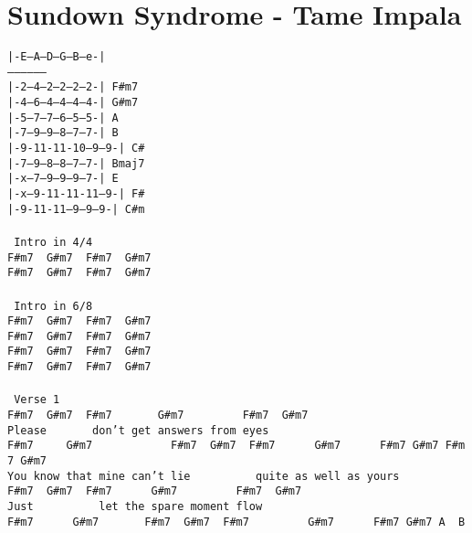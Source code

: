 \newpage
\section{Sundown Syndrome - Tame Impala}
\label{Sundown Syndrome - Tame Impala}
\texttt{|-E--A--D--G--B--e-|\\
------------------\\
|-2--4--2--2--2--2-|\ F\#m7\\
|-4--6--4--4--4--4-|\ G\#m7\\
|-5--7--7--6--5--5-|\ A\\
|-7--9--9--8--7--7-|\ B\\
|-9-11-11-10--9--9-|\ C\#\\
|-7--9--8--8--7--7-|\ Bmaj7\\
|-x--7--9--9--9--7-|\ E\\
|-x--9-11-11-11--9-|\ F\#\\
|-9-11-11--9--9--9-|\ C\#m\\
\\
\lbrack\ Intro\ in\ 4/4\rbrack\\
F\#m7\ \ G\#m7\ \ F\#m7\ \ G\#m7\\
F\#m7\ \ G\#m7\ \ F\#m7\ \ G\#m7\\
\\
\lbrack\ Intro\ in\ 6/8\rbrack\\
F\#m7\ \ G\#m7\ \ F\#m7\ \ G\#m7\\
F\#m7\ \ G\#m7\ \ F\#m7\ \ G\#m7\\
F\#m7\ \ G\#m7\ \ F\#m7\ \ G\#m7\\
F\#m7\ \ G\#m7\ \ F\#m7\ \ G\#m7\\
\\
\lbrack\ Verse\ 1\rbrack\\
F\#m7\ \ G\#m7\ \ F\#m7\ \ \ \ \ \ \ G\#m7\ \ \ \ \ \ \ \ \ F\#m7\ \ G\#m7\\
Please\ \ \ \ \ \ \ don't\ get\ answers\ from\ eyes\\
F\#m7\ \ \ \ \ G\#m7\ \ \ \ \ \ \ \ \ \ \ \ F\#m7\ \ G\#m7\ \ F\#m7\ \ \ \ \ \ G\#m7\ \ \ \ \ \ F\#m7\ G\#m7\ F\#m7\ G\#m7\\
You\ know\ that\ mine\ can't\ lie\ \ \ \ \ \ \ \ \ \ quite\ as\ well\ as\ yours\\
F\#m7\ \ G\#m7\ \ F\#m7\ \ \ \ \ \ G\#m7\ \ \ \ \ \ \ \ \ F\#m7\ \ G\#m7\\
Just\ \ \ \ \ \ \ \ \ \ let\ the\ spare\ moment\ flow\\
F\#m7\ \ \ \ \ \ G\#m7\ \ \ \ \ \ \ F\#m7\ \ G\#m7\ \ F\#m7\ \ \ \ \ \ \ \ \ G\#m7\ \ \ \ \ \ F\#m7\ G\#m7\ A\ \ B\\
}
